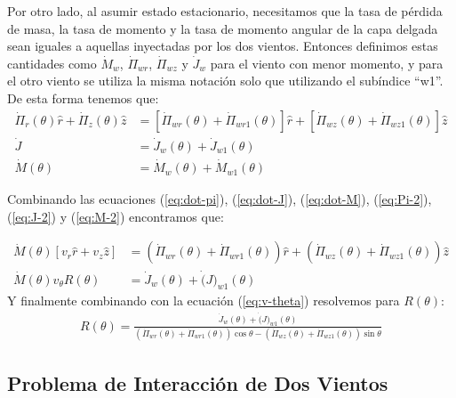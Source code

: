 Por otro lado, al asumir estado estacionario, necesitamos que la tasa de pérdida de masa, la tasa de
momento y la tasa de momento angular de la capa delgada sean iguales a aquellas inyectadas por los dos
vientos. Entonces definimos estas cantidades como $\dot{M}_w$, $\dot{\Pi}_{wr}$, $\dot{\Pi}_{wz}$ y
$\dot{J}_{w}$ para el viento con menor momento, y para el otro viento se utiliza la misma notación
solo que utilizando el subíndice ``w1''. De esta forma tenemos que:
\begin{align}
  \dot{\Pi}_r(\theta)\hat{r} + \dot{\Pi}_z(\theta)\hat{z} &= \left[\dot{\Pi}_{wr}(\theta)+ \dot{\Pi}_{wr1}(\theta)
                                                            \right]\hat{r} + \left[\dot{\Pi}_{wz}(\theta)+ \dot{\Pi}_{wz1}(\theta)\right]\hat{z}
                                                            \label{eq:Pi-2} \\
  \dot{J} &=\dot{J}_w(\theta) + \dot{J}_{w1}(\theta) \label{eq:J-2}\\
  \dot{M}(\theta) &= \dot{M}_w(\theta) + \dot{M}_{w1}(\theta) \label{eq:M-2}
\end{align}

Combinando las ecuaciones (\ref{eq:dot-pi}), (\ref{eq:dot-J}), (\ref{eq:dot-M}), (\ref{eq:Pi-2}), (\ref{eq:J-2}) y (\ref{eq:M-2})
encontramos que:

\begin{align}
  \dot{M}(\theta)\left[v_r \hat{r} + v_z\hat{z}\right] &= \left(\dot{\Pi}_{wr}(\theta) + \dot{\Pi}_{wr1}(\theta)\right)\hat{r} +
                                                         \left(\dot{\Pi}_{wz}(\theta) + \dot{\Pi}_{wz1}(\theta)\right)\hat{z} \\
  \dot{M}(\theta)v_\theta R(\theta) &= \dot{J}_w(\theta) + \dot(J)_{w1}(\theta)
\end{align}
Y finalmente combinando con la ecuación (\ref{eq:v-theta}) resolvemos para $R(\theta)$:
\begin{align}
  R(\theta) = \frac{\dot{J}_w(\theta) + \dot(J)_{w1}(\theta)}{\left(\dot{\Pi}_{wr}(\theta) + \dot{\Pi}_{wr1}(\theta)\right)\cos\theta
  - \left(\dot{\Pi}_{wz}(\theta) + \dot{\Pi}_{wz1}(\theta)\right)\sin\theta} \label{eq:R-wind}
\end{align}



\subsection{Problema de Interacción de Dos Vientos}

